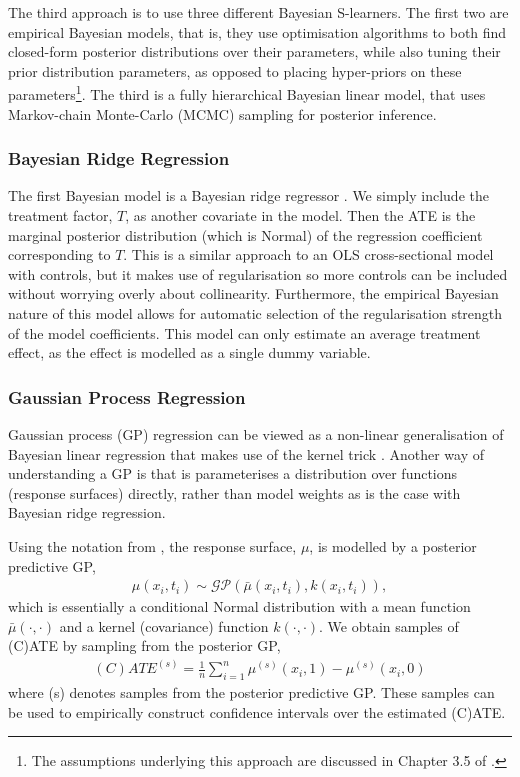 \documentclass[12pt, a4paper]{article}
\begin{document}
The third approach is to use three different Bayesian S-learners. The first two
are empirical Bayesian models, that is, they use optimisation algorithms to
both find closed-form posterior distributions over their parameters, while also
tuning their prior distribution parameters, as opposed to placing hyper-priors
on these parameters\footnote{The assumptions underlying this approach are
discussed in Chapter 3.5 of \cite{bishop2006}.}. The third is a fully
hierarchical Bayesian linear model, that uses Markov-chain Monte-Carlo (MCMC)
sampling for posterior inference.

\subsubsection*{Bayesian Ridge Regression}

The first Bayesian model is a Bayesian ridge regressor \citep{tipping2001}. We
simply include the treatment factor, $T$, as another covariate in the model.
Then the ATE is the marginal posterior distribution (which is Normal) of the
regression coefficient corresponding to $T$. This is a similar approach to an
OLS cross-sectional model with controls, but it makes use of regularisation so
more controls can be included without worrying overly about collinearity.
Furthermore, the empirical Bayesian nature of this model allows for automatic
selection of the regularisation strength of the model coefficients. This model
can only estimate an average treatment effect, as the effect is modelled as a
single dummy variable.

\subsubsection*{Gaussian Process Regression}

Gaussian process (GP) regression can be viewed as a non-linear generalisation
of Bayesian linear regression that makes use of the kernel trick
\citep{williams2006, bishop2006}. Another way of understanding a GP is that is
parameterises a distribution over functions (response surfaces) directly,
rather than model weights as is the case with Bayesian ridge regression.

Using the notation from \citet{williams2006}, the response surface, $\mu$, is
modelled by a posterior predictive GP,
\begin{align*}
  \mu(x_i, t_i) \sim \mathcal{GP}\left(\bar{\mu}(x_i, t_i), k(x_i, t_i)\right),
\end{align*}
which is essentially a conditional Normal distribution with a mean function
$\bar{\mu}(\cdot, \cdot)$ and a kernel (covariance) function $k(\cdot, \cdot)$.
We obtain samples of (C)ATE by sampling from the posterior GP,
\begin{align*}
  (C)ATE^{(s)} = \frac{1}{n} \sum_{i=1}^{n} \mu^{(s)}(x_i, 1) - \mu^{(s)}(x_i, 0)
\end{align*}
where (s) denotes samples from the posterior predictive GP. These samples can
be used to empirically construct confidence intervals over the estimated
(C)ATE.
\end{document}
